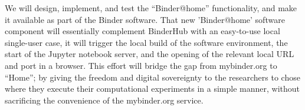 \begin{task}
We will design, implement, and test the ``Binder@home'' functionality, and make it
available as part of the Binder software. That new 'Binder@home' software component will
essentially complement BinderHub with an easy-to-use local single-user case, it will trigger
the local build of the software environment, the start of the Jupyter notebook
server, and the opening of the relevant local URL and port in a browser.
This effort will bridge the gap from mybinder.org to ``Home'';
by giving the freedom and digital sovereignty
to the researchers to chose where they execute their computational experiments in a simple manner,
without sacrificing the convenience of the mybinder.org service.

\end{task}
